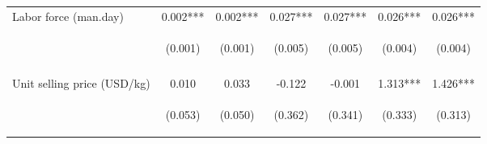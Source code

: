 \begin{center}
\begin{tabular}{lcccccc}
Labor force (man.day) & 0.002*** & 0.002*** & 0.027*** & 0.027*** & 0.026*** & 0.026*** \\
 & \begin{footnotesize}(0.001)\end{footnotesize} & \begin{footnotesize}(0.001)\end{footnotesize} & \begin{footnotesize}(0.005)\end{footnotesize} & \begin{footnotesize}(0.005)\end{footnotesize} & \begin{footnotesize}(0.004)\end{footnotesize} & \begin{footnotesize}(0.004)\end{footnotesize} \\
\vspace{4pt} & \begin{footnotesize}[0.003]\end{footnotesize} & \begin{footnotesize}[0.003]\end{footnotesize} & \begin{footnotesize}[0.000]\end{footnotesize} & \begin{footnotesize}[0.000]\end{footnotesize} & \begin{footnotesize}[0.000]\end{footnotesize} & \begin{footnotesize}[0.000]\end{footnotesize} \\
Unit selling price (USD/kg) & 0.010 & 0.033 & -0.122 & -0.001 & 1.313*** & 1.426*** \\
 & \begin{footnotesize}(0.053)\end{footnotesize} & \begin{footnotesize}(0.050)\end{footnotesize} & \begin{footnotesize}(0.362)\end{footnotesize} & \begin{footnotesize}(0.341)\end{footnotesize} & \begin{footnotesize}(0.333)\end{footnotesize} & \begin{footnotesize}(0.313)\end{footnotesize} \\

\end{tabular}
\end{center}

